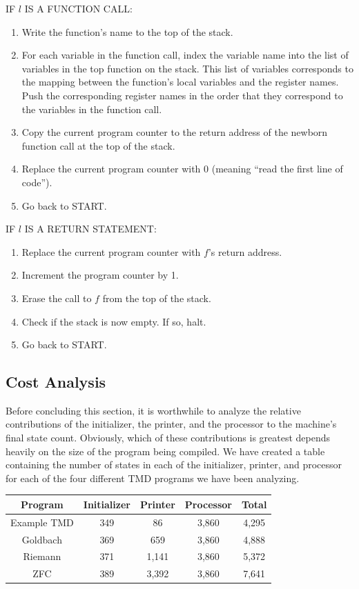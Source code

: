 \documentclass[11pt]{article}
\newcommand{\statenum}{7,641 }
\newcommand{\gbstatenum}{4,888 }
\newcommand{\rmstatenum}{5,372 }
\begin{document}
IF $l$ IS A FUNCTION CALL:
\begin{enumerate}
\item Write the function's name to the top of the stack.
\item For each variable in the function call, index the variable name into the list of variables in the top function on the stack. This list of variables corresponds to the mapping between the function's local variables and the register names. Push the corresponding register names in the order that they correspond to the variables in the function call. 
\item Copy the current program counter to the return address of the newborn function call at the top of the stack.
\item Replace the current program counter with 0 (meaning ``read the first line of code'').
\item Go back to START.
\end{enumerate}

IF $l$ IS A RETURN STATEMENT:
\begin{enumerate}
\item Replace the current program counter with $f$'s return address.
\item Increment the program counter by 1.
\item Erase the call to $f$ from the top of the stack.
\item Check if the stack is now empty. If so, halt.
\item Go back to START.
\end{enumerate}

\subsection{Cost Analysis} \label{sec:cost}

Before concluding this section, it is worthwhile to analyze the relative contributions of the initializer, the printer, and the processor to the machine's final state count. Obviously, which of these contributions is greatest depends heavily on the size of the program being compiled. We have created a table containing the number of states in each of the initializer, printer, and processor for each of the four different TMD programs we have been analyzing. 

\begin{center}
    \begin{tabular}{||c c c c c||}
    \hline
    Program & Initializer & Printer & Processor & Total \\ [0.5ex]
    \hline\hline
    Example TMD & 349 & 86 & 3,860 & 4,295 \\
    \hline
    Goldbach & 369 & 659 & 3,860 & \gbstatenum \\
    \hline
    Riemann & 371 & 1,141 & 3,860 & \rmstatenum \\
    \hline 
    ZFC & 389 & 3,392 & 3,860 & \statenum \\
    \hline
    \end{tabular}
\end{center}
\end{document}
